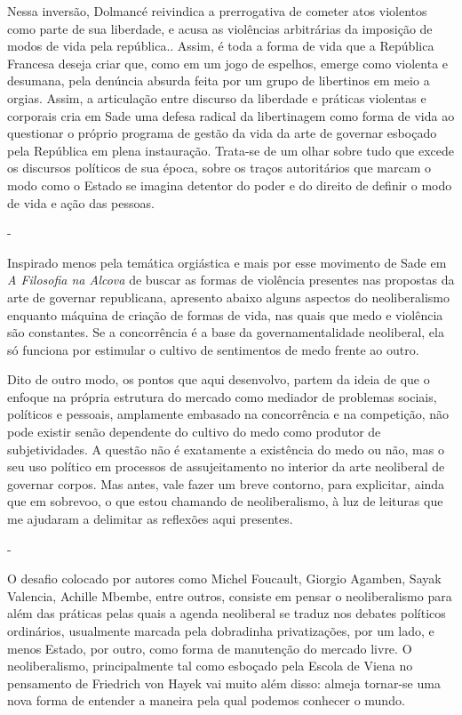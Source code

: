 Nessa inversão, Dolmancé reivindica a prerrogativa de cometer atos
violentos como parte de sua liberdade, e acusa as violências arbitrárias
da imposição de modos de vida pela república.. Assim, é toda a forma de
vida que a República Francesa deseja criar que, como em um jogo de
espelhos, emerge como violenta e desumana, pela denúncia absurda feita
por um grupo de libertinos em meio a orgias. Assim, a articulação entre
discurso da liberdade e práticas violentas e corporais cria em Sade uma
defesa radical da libertinagem como forma de vida ao questionar o
próprio programa de gestão da vida da arte de governar esboçado pela
República em plena instauração. Trata-se de um olhar sobre tudo que
excede os discursos políticos de sua época, sobre os traços autoritários
que marcam o modo como o Estado se imagina detentor do poder e do
direito de definir o modo de vida e ação das pessoas.

-

Inspirado menos pela temática orgiástica e mais por esse movimento de
Sade em \emph{A Filosofia na Alcova} de buscar as formas de violência
presentes nas propostas da arte de governar republicana, apresento
abaixo alguns aspectos do neoliberalismo enquanto máquina de criação de
formas de vida, nas quais que medo e violência são constantes. Se a
concorrência é a base da governamentalidade neoliberal, ela só funciona
por estimular o cultivo de sentimentos de medo frente ao outro.

Dito de outro modo, os pontos que aqui desenvolvo, partem da ideia de
que o enfoque na própria estrutura do mercado como mediador de problemas
sociais, políticos e pessoais, amplamente embasado na concorrência e na
competição, não pode existir senão dependente do cultivo do medo como
produtor de subjetividades. A questão não é exatamente a existência do
medo ou não, mas o seu uso político em processos de assujeitamento no
interior da arte neoliberal de governar corpos. Mas antes, vale fazer um
breve contorno, para explicitar, ainda que em sobrevoo, o que estou
chamando de neoliberalismo, à luz de leituras que me ajudaram a
delimitar as reflexões aqui presentes.

-

O desafio colocado por autores como Michel Foucault, Giorgio Agamben,
Sayak Valencia, Achille Mbembe, entre outros, consiste em pensar o
neoliberalismo para além das práticas pelas quais a agenda neoliberal se
traduz nos debates políticos ordinários, usualmente marcada pela
dobradinha privatizações, por um lado, e menos Estado, por outro, como
forma de manutenção do mercado livre. O neoliberalismo, principalmente
tal como esboçado pela Escola de Viena no pensamento de Friedrich von
Hayek vai muito além disso: almeja tornar-se uma nova forma de entender
a maneira pela qual podemos conhecer o mundo.


